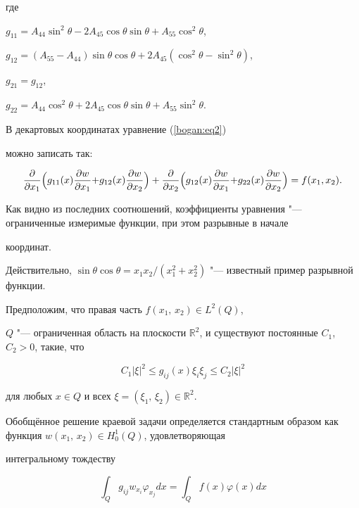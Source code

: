 где

$g_{11}= A_{44}\sin^2 \theta -2A_{45}\cos \theta \sin \theta+A_{55}\cos^2 \theta$, 

$g_{12}= (A_{55}-A_{44})\sin \theta \cos \theta+2 A_{45}(\cos^2 \theta -\sin^2 \theta)$, 

$g_{21}= g_{12}$,

$g_{22}= A_{44}\cos^2\theta+2 A_{45}\cos \theta \sin \theta + A_{55}\sin^2 \theta$.

В декартовых координатах  уравнение (\ref{bogan:eq2})

можно записать так:

\begin{equation}

\label{bogan:eq6}

 \dfrac{\partial }{\partial x_1}\Bigl(g_{11}(x) \dfrac{\partial w}{\partial x_1}{+} g_{12}(x)\dfrac{\partial

w}{\partial x_2} \Bigr)+ \dfrac{\partial }{\partial

x_2}\Bigl(g_{12}(x) \dfrac{\partial w}{\partial x_1}{+}

g_{22}(x)\dfrac{\partial w}{\partial x_2} \Bigr)=f(x_1,x_2).

\end{equation}

Как видно из последних соотношений, коэффициенты уравнения "--- ограниченные измеримые функции, при этом разрывные в начале

координат. 

Действительно,  $ \sin \theta \cos \theta= x_1 x_2/(x_1^2 +x_2^2)$ "--- известный пример разрывной функции.

Предположим, что  правая часть $ f(x_1,\,x_2)\in L^2(Q) $, 

 $Q$ "---   ограниченная область на плоскости $\mathbb R^2$, и  существуют постоянные $C_1$, $C_2 > 0$, такие, что

\[

 C_1 |\xi|^2 \leqslant g_{ij}(x)\xi_i \xi_j \leqslant C_2 |\xi|^2

  \]

для любых $x \in Q$ и всех $ \xi=(\xi_1,\,\xi_2)\in \mathbb R^2$.

Обобщённое решение краевой задачи определяется стандартным образом как функция $ w(x_1,\,x_2) \in H_0^1(Q)$, удовлетворяющая

интегральному тождеству

\begin{equation}

\label{bogan:eq7} \int_Q g_{ij} w_{x_i} \varphi_{x_j} dx=\int_Q f(x)\varphi(x) dx

\end{equation}

